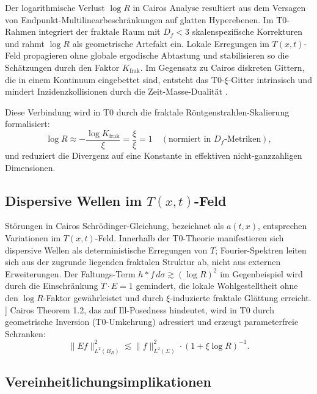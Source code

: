 	Der logarithmische Verlust $\log R$ in Cairos Analyse resultiert aus dem Versagen von Endpunkt-Multilinearbeschränkungen auf glatten Hyperebenen. Im T0-Rahmen integriert der fraktale Raum mit $D_f < 3$ skalenspezifische Korrekturen und rahmt $\log R$ als geometrische Artefakt ein. Lokale Erregungen im $T(x,t)$-Feld propagieren ohne globale ergodische Abtastung und stabilisieren so die Schätzungen durch den Faktor $K_\text{frak}$. Im Gegensatz zu Cairos diskreten Gittern, die in einem Kontinuum eingebettet sind, entsteht das T0-$\xi$-Gitter intrinsisch und mindert Inzidenzkollisionen durch die Zeit-Masse-Dualität \cite{T0_netze_en}.
	
	Diese Verbindung wird in T0 durch die fraktale Röntgenstrahlen-Skalierung formalisiert:
	\begin{equation}
		\log R \approx -\frac{\log K_\text{frak}}{\xi} = \frac{\xi}{\xi} = 1 \quad (\text{normiert in } D_f\text{-Metriken}),
	\end{equation}
	und reduziert die Divergenz auf eine Konstante in effektiven nicht-ganzzahligen Dimensionen.
	
	\subsection{Dispersive Wellen im $T(x,t)$-Feld}
	
	Störungen in Cairos Schrödinger-Gleichung, bezeichnet als $a(t,x)$, entsprechen Variationen im $T(x,t)$-Feld. Innerhalb der T0-Theorie manifestieren sich dispersive Wellen als deterministische Erregungen von $T$; Fourier-Spektren leiten sich aus der zugrunde liegenden fraktalen Struktur ab, nicht aus externen Erweiterungen. Der Faltungs-Term $h \ast f \, d\sigma \gtrsim (\log R)^2$ im Gegenbeispiel wird durch die Einschränkung $T \cdot E = 1$ gemindert, die lokale Wohlgestelltheit ohne den $\log R$-Faktor gewährleistet und durch $\xi$-induzierte fraktale Glättung erreicht.
]	
	Cairos Theorem 1.2, das auf Ill-Posedness hindeutet, wird in T0 durch geometrische Inversion (T0-Umkehrung) adressiert und erzeugt parameterfreie Schranken:
	\begin{equation}
		\|Ef\|_{L^2(B_R)}^2 \lesssim \|f\|_{L^2(\Sigma)}^2 \cdot (1 + \xi \log R)^{-1}.
	\end{equation}
	
	\subsection{Vereinheitlichungsimplikationen}
	
